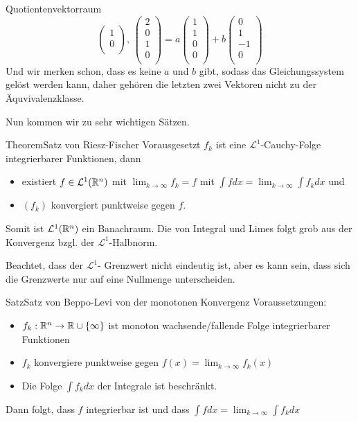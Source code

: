 \begin{Beispiel}{Quotientenvektorraum}
$$\begin{pmatrix}
        1 \\
        0 \\
    \end{pmatrix} \mbox{,     } \begin{pmatrix}
        2 \\
        0 \\
        1 \\
        0 \\
    \end{pmatrix}=a \begin{pmatrix}
        1 \\
        1 \\
        0 \\
        0 \\
    \end{pmatrix}+b\begin{pmatrix}
        0 \\
        1 \\
        -1 \\
        0 \\
    \end{pmatrix}$$
    Und wir merken schon, dass es keine $a$ und $b$ gibt, sodass das Gleichungssystem gelöst werden kann, daher gehören die letzten zwei Vektoren nicht zu der Äquvivalenzklasse.
\end{Beispiel}
Nun kommen wir zu sehr wichtigen Sätzen.
\begin{Satz}{Theorem}{Satz von Riesz-Fischer}
    Vorausgesetzt $f_k$ ist eine $\mathcal{L}^1$-Cauchy-Folge integrierbarer Funktionen, dann \begin{itemize}
        \item existiert $f\in \mathcal{L}^1(\mathbb{R}^n)$ mit $\lim_{k\rightarrow \infty}f_k = f$ mit $\int f dx = \lim_{k\rightarrow \infty}\int f_k dx$ und
        \item $(f_k)$ konvergiert punktweise gegen $f$.
    \end{itemize}
    Somit ist $\mathcal{L}^1(\mathbb{R}^n)$ ein Banachraum. Die  von Integral und Limes folgt grob aus der Konvergenz bzgl. der $\mathcal{L}^1$-Halbnorm.
\end{Satz}
Beachtet, dass der $\mathcal{L}^1$- Grenzwert nicht eindeutig ist, aber es kann sein, dass sich die Grenzwerte nur auf eine Nullmenge unterscheiden.
\begin{Satz}{Satz}{Satz von Beppo-Levi von der monotonen Konvergenz}
    Voraussetzungen:
    \begin{itemize}
        \item $f_k:\mathbb{R}^n\rightarrow \mathbb{R} \cup \{ \infty\}$ ist monoton wachsende/fallende Folge integrierbarer Funktionen
        \item $f_k$ konvergiere punktweise gegen $f(x)=\lim_{k\rightarrow \infty} f_k(x)$
        \item Die Folge $\int f_k dx$ der Integrale ist beschränkt.
    \end{itemize}
    Dann folgt, dass $f$ integrierbar ist und dass $\int f dx = \lim_{k\rightarrow \infty} \int f_k dx$
\end{Satz}
